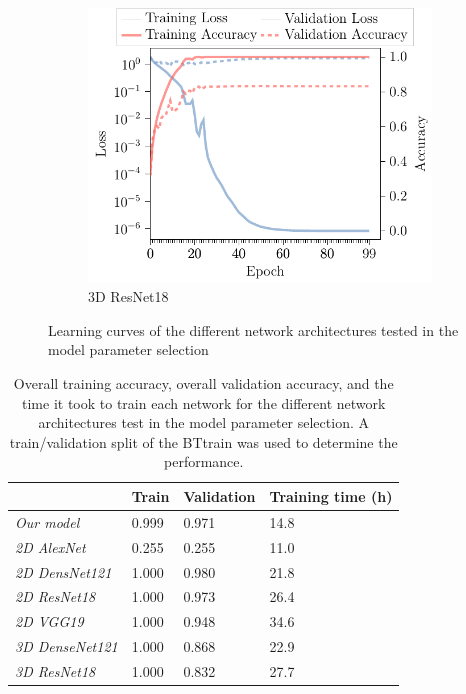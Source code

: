 \begin{subappendices}
\begin{figure}
\begin{subfigure}[t]{\modelplotwidth}
    \includegraphics[width=\textwidth]{Figures/Appendix/ResNet_3D.pdf}
    \caption{3D ResNet18}\label{fig:ResNet3D}
\end{subfigure}

\caption{Learning curves of the different network architectures tested in the model parameter selection}\label{fig:modellearningcurves}
\end{figure}

\begin{table}[H]
 \centering
  \caption{Overall training accuracy, overall validation accuracy, and the time it took to train each network for the different network architectures test in the model parameter selection.
  A train/validation split of the \gls{BTtrain} was used to determine the performance.}
  \label{tab:modelaccuracies}
  \begin{tabular}{L{2.5cm}C{2cm}C{2cm}C{2cm}}
      \toprule
& \textbf{Train} & \textbf{Validation} & \textbf{Training time (h)}\\
    \midrule
    \textit{Our model} & 0.999 & 0.971 & 14.8\\
    \textit{2D AlexNet} & 0.255 & 0.255 & 11.0\\
    \textit{2D DensNet121} & 1.000 & 0.980 & 21.8\\
    \textit{2D ResNet18} & 1.000 & 0.973 & 26.4\\
    \textit{2D VGG19} & 1.000 & 0.948 & 34.6\\
    \textit{3D DenseNet121} & 1.000 & 0.868 & 22.9\\
    \textit{3D ResNet18} & 1.000 & 0.832 & 27.7\\
  \bottomrule
  \end{tabular}
\end{table}


\end{subappendices}
